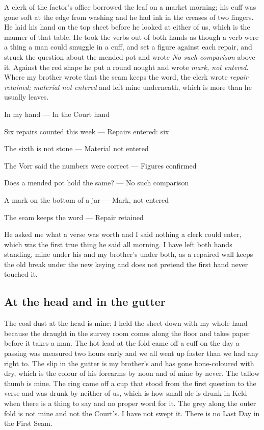 \documentclass{design/chronicle}
\begin{document}
A clerk of the factor’s office borrowed the leaf on a market morning; his cuff was gone soft at the edge from washing and he had ink in the creases of two fingers. He laid his hand on the top sheet before he looked at either of us, which is the manner of that table. He took the verbs out of both hands as though a verb were a thing a man could smuggle in a cuff, and set a figure against each repair, and struck the question about the mended pot and wrote \emph{No such comparison} above it. Against the red shape he put a round nought and wrote \emph{mark, not entered}. Where my brother wrote that the seam keeps the word, the clerk wrote \emph{repair retained; material not entered} and left mine underneath, which is more than he usually leaves.

In my hand — In the Court hand\par

Six repairs counted this week — Repairs entered: six\par

The sixth is not stone — Material not entered\par

The Vorr said the numbers were correct — Figures confirmed\par

Does a mended pot hold the same? — No such comparison\par

A mark on the bottom of a jar — Mark, not entered\par

The seam keeps the word — Repair retained\par

He asked me what a verse was worth and I said nothing a clerk could enter, which was the first true thing he said all morning. I have left both hands standing, mine under his and my brother’s under both, as a repaired wall keeps the old break under the new keying and does not pretend the first hand never touched it.

\subsection*{At the head and in the gutter}

The coal dust at the head is mine; I held the sheet down with my whole hand because the draught in the survey room comes along the floor and takes paper before it takes a man. The hot lead at the fold came off a cuff on the day a passing was measured two hours early and we all went up faster than we had any right to. The slip in the gutter is my brother’s and has gone bone-coloured with dry, which is the colour of his forearms by noon and of mine by never. The tallow thumb is mine. The ring came off a cup that stood from the first question to the verse and was drunk by neither of us, which is how small ale is drunk in Keld when there is a thing to say and no proper word for it. The grey along the outer fold is not mine and not the Court’s. I have not swept it. There is no Last Day in the First Seam.
\end{document}
